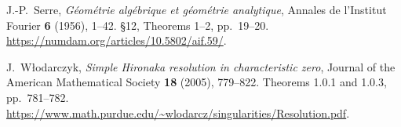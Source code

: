 J.-P.~Serre, \emph{Géométrie algébrique et géométrie analytique},
Annales de l'Institut Fourier \textbf{6} (1956), 1--42.
\S12, Theorems 1--2, pp.~19--20.
\url{https://numdam.org/articles/10.5802/aif.59/}.

J.~W{\l}odarczyk, \emph{Simple Hironaka resolution in characteristic zero},
Journal of the American Mathematical Society \textbf{18} (2005), 779--822.
Theorems 1.0.1 and 1.0.3, pp.~781--782.
\url{https://www.math.purdue.edu/~wlodarcz/singularities/Resolution.pdf}.
